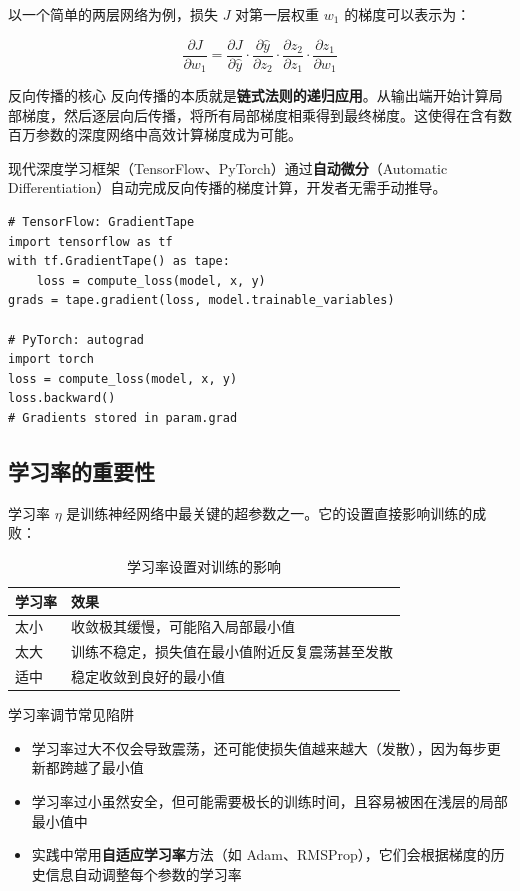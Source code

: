 \documentclass[a4paper]{article}
\begin{document}
以一个简单的两层网络为例，损失 $J$ 对第一层权重 $w_1$ 的梯度可以表示为：

$$\frac{\partial J}{\partial w_1} = \frac{\partial J}{\partial \hat{y}} \cdot \frac{\partial \hat{y}}{\partial z_2} \cdot \frac{\partial z_2}{\partial z_1} \cdot \frac{\partial z_1}{\partial w_1}$$

\begin{importantbox}{反向传播的核心}
反向传播的本质就是\textbf{链式法则的递归应用}。从输出端开始计算局部梯度，然后逐层向后传播，将所有局部梯度相乘得到最终梯度。这使得在含有数百万参数的深度网络中高效计算梯度成为可能。
\end{importantbox}

现代深度学习框架（TensorFlow、PyTorch）通过\textbf{自动微分}（Automatic Differentiation）自动完成反向传播的梯度计算，开发者无需手动推导。

\begin{lstlisting}[caption={TensorFlow 和 PyTorch 中的自动微分}]
# TensorFlow: GradientTape
import tensorflow as tf
with tf.GradientTape() as tape:
    loss = compute_loss(model, x, y)
grads = tape.gradient(loss, model.trainable_variables)

# PyTorch: autograd
import torch
loss = compute_loss(model, x, y)
loss.backward()
# Gradients stored in param.grad
\end{lstlisting}

\subsection{学习率的重要性}

学习率 $\eta$ 是训练神经网络中最关键的超参数之一。它的设置直接影响训练的成败：

\begin{table}[H]
\centering
\begin{tabular}{lp{9cm}}
\toprule
\textbf{学习率} & \textbf{效果} \\
\midrule
太小 & 收敛极其缓慢，可能陷入局部最小值 \\
太大 & 训练不稳定，损失值在最小值附近反复震荡甚至发散 \\
适中 & 稳定收敛到良好的最小值 \\
\bottomrule
\end{tabular}
\caption{学习率设置对训练的影响}
\end{table}

\begin{warningbox}{学习率调节常见陷阱}
\begin{itemize}
\item 学习率过大不仅会导致震荡，还可能使损失值越来越大（发散），因为每步更新都跨越了最小值
\item 学习率过小虽然安全，但可能需要极长的训练时间，且容易被困在浅层的局部最小值中
\item 实践中常用\textbf{自适应学习率}方法（如 Adam、RMSProp），它们会根据梯度的历史信息自动调整每个参数的学习率
\end{itemize}
\end{warningbox}
\end{document}
